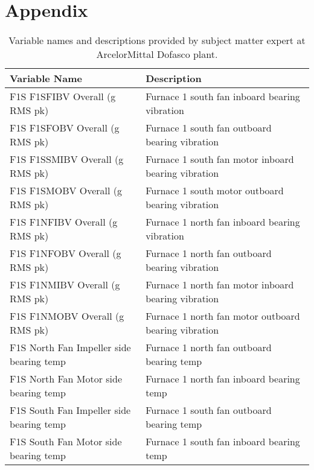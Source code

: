 \section*{Appendix}

\begin{table}[!h]
    \begin{tabular}{ll}
    \textbf{Variable Name}                   & \textbf{Description }                                   \\ \hline
    F1S F1SFIBV Overall (g RMS pk)           & Furnace 1 south fan inboard bearing vibration        \\
    F1S F1SFOBV Overall (g RMS pk)           & Furnace 1 south fan outboard bearing vibration       \\
    F1S F1SSMIBV Overall (g RMS pk)          & Furnace 1 south fan motor inboard bearing vibration  \\
    F1S F1SMOBV Overall (g RMS pk)           & Furnace 1 south motor outboard bearing vibration     \\
    F1S F1NFIBV Overall (g RMS pk)           & Furnace 1 north fan inboard bearing vibration        \\
    F1S F1NFOBV Overall (g RMS pk)           & Furnace 1 north fan outboard bearing vibration       \\
    F1S F1NMIBV Overall (g RMS pk)           & Furnace 1 north fan motor inboard bearing vibration  \\
    F1S F1NMOBV Overall (g RMS pk)           & Furnace 1 north fan motor outboard bearing vibration \\
    F1S North Fan Impeller side bearing temp & Furnace 1 north fan outboard bearing temp            \\
    F1S North Fan Motor side bearing temp    & Furnace 1 north fan inboard bearing temp             \\
    F1S South Fan Impeller side bearing temp & Furnace 1 south fan outboard bearing temp            \\
    F1S South Fan Motor side bearing temp    & Furnace 1 south fan inboard bearing temp            
    \end{tabular}
    \label{tbl:var}
    \caption{Variable names and descriptions provided by subject matter expert at ArcelorMittal Dofasco plant.}
\end{table}